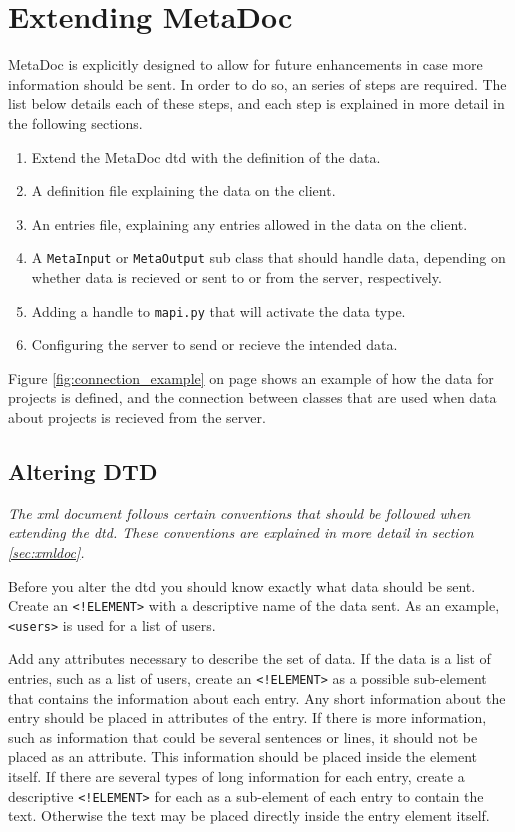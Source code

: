 \newpage
\section{Extending MetaDoc}
\label{sec:extending}
MetaDoc is explicitly designed to allow for future enhancements in case more
information should be sent. In order to do so, an series of steps are required.
The list below details each of these steps, and each step is explained in more
detail in the following sections.

\begin{enumerate}
    \item
        Extend the MetaDoc \gls{dtd} with the definition of the data.
    \item
        A definition file explaining the data on the client.
    \item
        An entries file, explaining any entries allowed in the data on the 
        client.
    \item
        A \texttt{MetaInput} or \texttt{MetaOutput} sub class that should
        handle data, depending on whether data is recieved or sent to or from
        the server, respectively.
    \item
        Adding a handle to \texttt{mapi.py} that will activate the data type.
    \item
        Configuring the server to send or recieve the intended data.
\end{enumerate}

Figure \ref{fig:connection_example} on page \pageref{fig:connection_example}
shows an example of how the data for projects is defined, and the connection
between classes that are used when data about projects is recieved from the
server.


\subsection{Altering DTD}
\textit{The \gls{xml} document follows certain conventions that should be
followed when extending the \gls{dtd}. These conventions are explained in more
detail in section \ref{sec:xmldoc}.}

Before you alter the \gls{dtd} you should know exactly what data should be
sent.  Create an \texttt{<!ELEMENT>} with a descriptive name of the data sent.
As an example, \texttt{<users>} is used for a list of users. 

Add any attributes necessary to describe the set of data. If the data is a list
of entries, such as a list of users, create an \texttt{<!ELEMENT>} as a
possible sub-element that contains the information about each entry. Any short
information about the entry should be placed in attributes of the entry. If
there is more information, such as information that could be several sentences
or lines, it should not be placed as an attribute. This information should be
placed inside the element itself. If there are several types of long
information for each entry, create a descriptive \texttt{<!ELEMENT>} for each
as a sub-element of each entry to contain the text. Otherwise the text may be
placed directly inside the entry element itself. 

